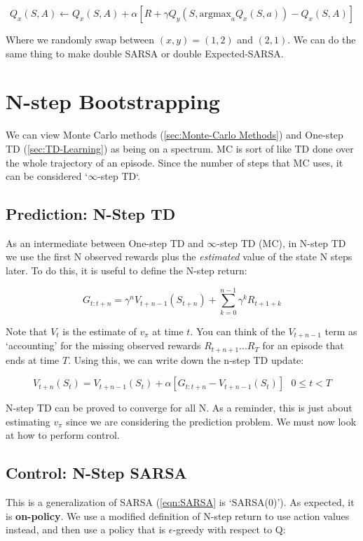 \documentclass[11pt]{report}
\begin{document}
\begin{equation}
	\label{eqn:double-q-learning}
	Q_x(S,A) \xleftarrow{} Q_x(S,A) + \alpha\left[R + \gamma Q_y(S, \text{argmax}_aQ_x(S, a)) - Q_x(S,A)\right]
\end{equation}

Where we randomly swap between $(x, y) = (1, 2)$ and $(2, 1)$. We can do the same thing to make double SARSA or double Expected-SARSA.


\chapter{N-step Bootstrapping}
We can view Monte Carlo methods (\autoref{sec:Monte-Carlo Methods}) and One-step TD (\autoref{sec:TD-Learning}) as being on a spectrum. MC is sort of like TD done over the whole trajectory of an episode. Since the number of steps that MC uses, it can be considered `$\infty$-step TD`.

\section{Prediction: N-Step TD}
As an intermediate between One-step TD and $\infty$-step TD (MC), in N-step TD we use the first N observed rewards plus the \textit{estimated} value of the state N steps later. To do this, it is useful to define the N-step return:


\begin{equation}
	\label{eqn:n-step-return}
	G_{t:t+n} = \gamma^nV_{t+n-1}(S_{t+n}) + \sum_{k = 0}^{n-1}\gamma^kR_{t+1+k}
\end{equation}

Note that $V_{t}$ is the estimate of $v_\pi$ at time $t$. You can think of the $V_{t+n-1}$ term as `accounting' for the missing observed rewards $R_{t+n+1}...R_{T}$ for an episode that ends at time $T$. Using this, we can write down the n-step TD update:

\begin{equation}
	\label{eqn:n-step-td}
	V_{t+n}(S_t) = V_{t+n-1}(S_t) + \alpha [ G_{t:t+n} - V_{t+n-1}(S_t)] \ \ \ 0 \le t < T
\end{equation}

N-step TD can be proved to converge for all N. As a reminder, this is just about estimating $v_\pi$ since we are considering the prediction problem. We must now look at how to perform control.

\section{Control: N-Step SARSA}
This is a generalization of SARSA (\autoref{eqn:SARSA} is `SARSA(0)'). As expected, it is \textbf{on-policy}. We use a modified definition of N-step return to use action values instead, and then use a policy that is $\epsilon$-greedy with respect to Q:
\end{document}
